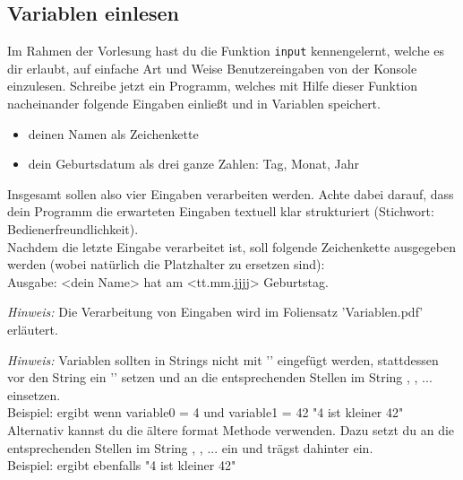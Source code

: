 \subsection{Variablen einlesen}
Im Rahmen der Vorlesung hast du die Funktion \texttt{input} kennengelernt, welche es dir erlaubt, auf einfache Art und Weise Benutzereingaben von der Konsole einzulesen. Schreibe jetzt ein Programm, welches mit Hilfe dieser Funktion nacheinander folgende Eingaben einließt und in Variablen speichert. 
\begin{itemize}
	\item deinen Namen als Zeichenkette
	\item dein Geburtsdatum als drei ganze Zahlen: Tag, Monat, Jahr
\end {itemize}
Insgesamt sollen also vier Eingaben verarbeiten werden. Achte dabei darauf, dass dein Programm die erwarteten Eingaben textuell klar strukturiert (Stichwort: Bedienerfreundlichkeit).\\Nachdem die letzte Eingabe verarbeitet ist, soll folgende Zeichenkette ausgegeben werden (wobei natürlich die Platzhalter zu ersetzen sind):\\Ausgabe: {\ttfamily{\dq}}<dein Name> hat am <tt.mm.jjjj> Geburtstag.{\ttfamily{\dq}}

\textit{Hinweis:} Die Verarbeitung von Eingaben wird im Foliensatz 'Variablen.pdf' erläutert.

\textit{Hinweis:} Variablen sollten in Strings nicht mit '\pythoninline{+}' eingefügt werden, stattdessen vor den String ein '' setzen und an die entsprechenden Stellen im String , , ... einsetzen. \\
Beispiel:  ergibt wenn variable0 = 4 und variable1 = 42 "4 ist kleiner 42"\\
Alternativ kannst du die ältere format Methode verwenden. Dazu setzt du an die entsprechenden Stellen im String , , ... ein und trägst dahinter  ein.\\
Beispiel:  ergibt ebenfalls "4 ist kleiner 42"
